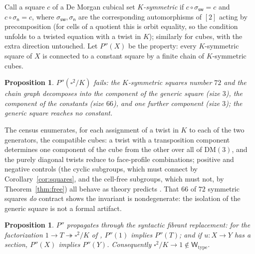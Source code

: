 \documentclass[11pt]{amsart}
\newtheorem{prop}[thm]{Proposition}
\theoremstyle{definition}
\newcommand{\DM}{\mathrm{DM}}
\newcommand{\Wtype}{\mathsf{W}_{\mathrm{type}}}
\newcommand{\sw}{\mathsf{sw}}
\newcommand{\nb}{\mathsf{n}}
\newcommand{\Kl}{K}
\begin{document}
Call a square $c$ of a De Morgan cubical set
\emph{$\Kl$-symmetric} if $c \circ \sigma_{\sw} = c$ and
$c \circ \sigma_{\nb} = c$, where $\sigma_{\sw}, \sigma_{\nb}$ are
the corresponding automorphisms of $[2]$ acting by precomposition
(for cells of a quotient this is orbit equality, so the condition
unfolds to a twisted equation with a twist in $\Kl$); similarly
for cubes, with the extra direction untouched.  Let $P''(X)$ be
the property: every $\Kl$-symmetric square of $X$ is connected to
a constant square by a finite chain of $\Kl$-symmetric cubes.

\begin{prop}
  \label{prop:census}
  $P''(\square^2/\Kl)$ fails: the $\Kl$-symmetric squares number
  $72$ and the chain graph decomposes into the component of the
  generic square (size $3$), the component of the constants (size
  $66$), and one further component (size $3$); the generic square
  reaches no constant.
\end{prop}

The census enumerates, for each assignment of a twist in $\Kl$ to
each of the two generators, the compatible cubes: a twist with a
transposition component determines one component of the cube from
the other over all of $\DM(3)$, and the purely diagonal twists
reduce to face-profile combinations; positive and negative
controls (the cyclic subgroups, which must connect by
Corollary~\ref{cor:squares}, and the cell-free subgroups, which
must not, by Theorem~\ref{thm:free}) all behave as theory
predicts \cite{Artifact}.  That $66$ of $72$ symmetric squares
\emph{do} contract shows the invariant is nondegenerate: the
isolation of the generic square is not a formal artifact.

\begin{prop}
  \label{prop:syntactic}
  $P''$ propagates through the syntactic fibrant replacement:
  for the factorization $1 \to T \twoheadrightarrow
  \square^2/\Kl$ of \cite[\S4]{PaperK}, $P''(1)$ implies
  $P''(T)$; and if $u : X \to Y$ has a section, $P''(X)$ implies
  $P''(Y)$.  Consequently $\square^2/\Kl \to 1 \notin \Wtype$.
\end{prop}
\end{document}
